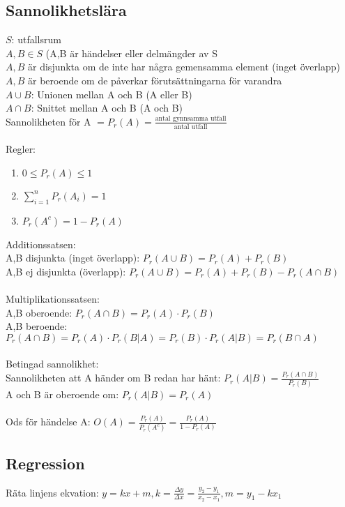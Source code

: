 \documentclass[a4paper,10pt]{article}
\begin{document}
\subsection*{Sannolikhetslära}
$S$: utfallsrum \\
$A,B \in S$ (A,B är händelser eller delmängder av S \\
$A,B$ är disjunkta om de inte har några gemensamma element (inget överlapp) \\
$A,B$ är beroende om de påverkar förutsättningarna för varandra \\
$A \cup B$: Unionen mellan A och B (A eller B) \\
$A \cap B$: Snittet mellan A och B (A och B) \\
Sannolikheten för A $= P_r(A) = \frac{\text{antal gynnsamma utfall}}{\text{antal utfall}}$ \\
 \\
Regler:
\begin{enumerate}
  \item{$0 \leq P_r(A) \leq 1$}
  \item{$\sum_{i=1}^n P_r(A_i) = 1$}
  \item{$P_r(A^c) = 1 - P_r(A)$}
\end{enumerate}
Additionssatsen: \\
A,B disjunkta (inget överlapp): $P_r(A \cup B) = P_r(A) + P_r(B)$ \\
A,B ej disjunkta (överlapp): $P_r(A \cup B) = P_r(A) + P_r(B) - P_r(A \cap B)$ \\
 \vspace{1mm} \\
Multiplikationssatsen: \\
A,B oberoende: $P_r(A \cap B) = P_r(A) \cdot P_r(B)$ \\
A,B beroende: $P_r(A \cap B) = P_r(A) \cdot P_r(B|A) = P_r(B) \cdot P_r(A|B) = P_r(B \cap A)$ \\
 \vspace{1mm} \\
Betingad sannolikhet: \\
Sannolikheten att A händer om B redan har hänt: $P_r(A|B) = \frac{P_r(A \cap B)}{P_r(B)}$ \\
A och B är oberoende om: $P_r(A|B) = P_r(A)$ \\
\vspace{1mm} \\
Ods för händelse A: $O(A) = \frac{P_r(A)}{P_r(A^c)} = \frac{P_r(A)}{1-P_r(A)}$

\subsection*{Regression}
Räta linjens ekvation: $y = kx + m, k=\frac{\Delta y}{\Delta x} = \frac{y_2 - y_1}{x_2 - x_1}, m=y_1 - kx_1$

\vfill
\end{document}
